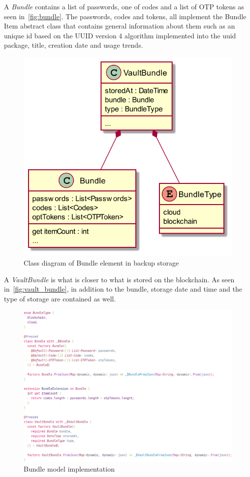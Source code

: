 \documentclass[a4paper,12pt]{report}
\begin{document}
A \textit{Bundle} contains a list of passwords, one of codes and a list of OTP
tokens as seen in~\autoref{fig:bundle}. The passwords, codes and tokens, all
implement the Bundle Item abstract class that contains general information
about them such as an unique id based on the UUID version 4
algorithm\cite{uuid} implemented into the uuid package\cite{uuidDocs}, title,
creation date and usage trends.

\begin{figure}[H]
    \centering
    \includegraphics[scale=0.35]{diagrams/class/vault.png}
    \caption{Class diagram of Bundle element in backup storage}\label{fig:vault_bundle}
\end{figure}

A \textit{VaultBundle} is what is closer to what is stored on the blockchain.
As seen in~\autoref{fig:vault_bundle}, in addition to the bundle, storage date
and time and the type of storage are contained as well.

\begin{figure}[H]
    \centering
    \includegraphics[scale=0.6]{images/code/bundle_model.png}
    \caption{Bundle model implementation}\label{fig:bundle_model}
\end{figure}
\end{document}
